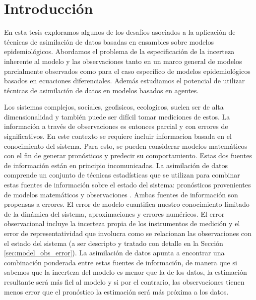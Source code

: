\chapter{Introducción}
En esta tesis exploramos algunos de los desafíos asociados a la aplicación de técnicas de asimilación de datos basadas en ensambles sobre modelos epidemiológicos. Abordamos el problema de la especificación de la incerteza inherente al modelo y las observaciones tanto en un marco general de modelos parcialmente observados como para el caso específico de modelos epidemiológicos basados en ecuaciones diferenciales. Además estudiamos el potencial de utilizar técnicas de asimilación de datos en modelos basados en agentes.

Los sistemas complejos, sociales, geofisicos, ecologicos, suelen ser de alta dimensionalidad y también puede ser difícil tomar mediciones de estos. La información a través de observaciones es entonces parcial y con errores de significativos. En este contexto se requiere incluir informacion basada en el conocimiento del sistema. Para esto, se pueden considerar modelos matemáticos con el fin de generar pronósticos y predecir su comportamiento. Estas dos fuentes de información están en principio incomunicadas. La asimilación de datos comprende un conjunto de técnicas estadísticas que se utilizan para combinar estas fuentes de información sobre el estado del sistema: pronósticos provenientes de modelos matemáticos y observaciones \citep{Kalnay2003}. Ambas fuentes de información son propensas a errores. El error de modelo cuantifica nuestro conocimiento limitado de la dinámica del sistema, aproximaciones y errores numéricos. El error observacional incluye la incerteza propia de los instrumentos de medición y el error de representatividad que involucra como se relacionan las observaciones con el estado del sistema (a ser descripto y tratado con detalle en la Sección \ref{sec:model_obs_error}). La asimilación de datos apunta a encontrar una combinación ponderada entre estas fuentes de información, de manera que si sabemos que la incerteza del modelo es menor que la de los datos, la estimación resultante será más fiel al modelo y si por el contrario, las observaciones tienen menos error que el pronóstico la estimación será más próxima a los datos.

